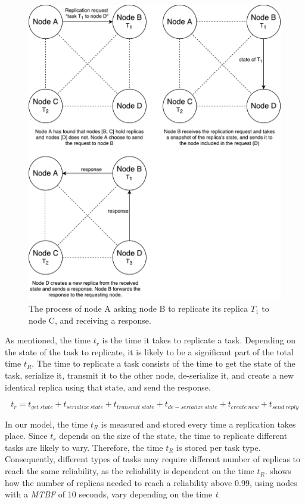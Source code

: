 \documentclass{cslthse-msc}
\begin{document}
\begin{figure}[!hbt]
\centering
\includegraphics[scale=0.5]{images/replication_request.pdf}
\caption[Replication request]{The process of node A asking node B to replicate its replica $T_{1}$ to node C, and receiving a response.}\label{fig:replication_request}
\end{figure}

As mentioned, the time $t_r$ is the time it takes to replicate a task. Depending on the state of the task to replicate, it is likely to be a significant part of the total time $t_R$. The time to replicate a task consists of the time to get the state of the task, serialize it, transmit it to the other node, de-serialize it, and create a new identical replica using that state, and send the response. 

\begin{equation} \label{eq:replication_time}
t_{r} = t_{get\ state} + t_{serialize\ state} + t_{transmit\ state} + t_{de-serialize\ state} + t_{create\ new} + t_{send\ reply}
\end{equation} 

In our model, the time $t_{R}$ is measured and stored every time a replication takes place. Since $t_{r}$ depends on the size of the state, the time to replicate different tasks are likely to vary. Therefore, the time $t_{R}$ is stored per task type. Consequently, different types of tasks may require different number of replicas to reach the same reliability, as the reliability is dependent on the time $t_R$.  shows how the number of replicas needed to reach a reliability above 0.99, using nodes with a \emph{MTBF} of 10 seconds, vary depending on the time \emph{t}.
\end{document}
